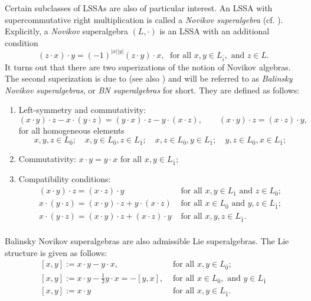 \documentclass[12pt]{amsart}
\begin{document}
Certain subclasses of LSSAs are also of particular interest.  An LSSA with supercommutative right multiplication is called a {\it Novikov superalgebra} (cf. \cite{BN, Xu}). Explicitly, a {\it Novikov}  superalgebra $(L, \cdot)$ is an LSSA with an additional condition
\[
(z \cdot x) \cdot y =(-1)^{|x||y|}(z \cdot y) \cdot x,\;  \text{ for all } x,y \in L_{\bar i}, \text{ and } z \in  L.
\]
It turns out that there are two superizations of the notion of Novikov algebras. The second superization is due to \cite{Bal} (see also \cite{PB}) and will be referred to as {\it Balinsky Novikov superalgebras}, or {\it BN superalgebras} for short. They are defined as follows: 
\begin{enumerate}
    \item Left-symmetry and commutativity:
    \[
    (x \cdot y)\cdot z-x \cdot (y \cdot z)= (y \cdot x) \cdot z- y \cdot (x \cdot z), \qquad (x \cdot y) \cdot z= (x \cdot z)\cdot y,
    \]
for all homogeneous elements
\[
x,y,z \in L_{\bar 0}; \quad x,y\in L_{\bar 0}, z \in L_{\bar 1};  \quad x,z\in L_{\bar 0}, y \in L_{\bar 1};  \quad y,z\in L_{\bar 0}, x \in L_{\bar 1}; 
\]
    \item Commutativity: $x\cdot y=y \cdot x$ for all $x,y\in L_{\bar 1}$;

    \item Compatibility conditions:
    \[
    \begin{array}{ll}
    (x \cdot y)\cdot z= (x \cdot z)\cdot y & \text{ for all } x,y\in L_{\bar 1} \text{ and } z\in  L_{\bar 0};\\[2mm]
    x \cdot (y \cdot z)=(x \cdot y)\cdot z+ y \cdot (x \cdot z) & \text{ for all } x\in L_{\bar 0} \text{ and } y, z\in  L_{\bar 1};\\[2mm]
    x \cdot (y \cdot z)= (x \cdot y)\cdot z + (x \cdot z)\cdot y & \text{ for all } x,y, z\in L_{\bar 1}.\\[2mm]
    \end{array}
    \]
\end{enumerate}
Balinsky Novikov superalgebras are also admissible Lie superalgebras. The Lie structure is given as follows: 
\[
\begin{array}{ll}
[x,y]:=x \cdot y - y \cdot x, & \text{ for all } x,y\in L_{\bar 0};\\[2mm]

[x,y]:=x \cdot y - \frac{1}{2} y \cdot x=-[y,x], & \text{ for all } x\in L_{\bar 0}, \text{ and } y\in L_{\bar 1}\\[2mm]

[x,y]:=x \cdot y  & \text{ for all } x,y\in L_{\bar 1}.
\end{array}
\]
\end{document}
